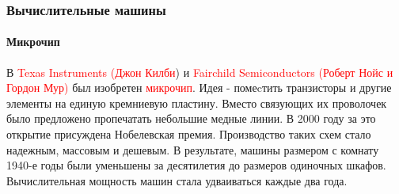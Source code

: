 \documentclass[aspectratio=169]{beamer}
\begin{document}
\begin{frame}
\frametitle{Вычислительные машины}
\framesubtitle{Микрочип}
\justifying
\small
В \textcolor{red}{Texas Instruments (Джон Килби}) и \textcolor{red}{Fairchild Semiconductors (Роберт Нойс и Гордон Мур)} был изобретен \textcolor{red}{микрочип}. Идея - помеcтить транзисторы и другие элементы на единую кремниевую пластину. Вместо связующих их проволочек было предложено пропечатать небольшие медные линии. В 2000 году за это открытие присуждена Нобелевская премия.\newline\newline 
Производство таких схем стало надежным, массовым и дешевым. В результате, машины размером с комнату 1940-е годы были уменьшены за десятилетия до размеров одиночных шкафов. Вычислительная мощность машин стала удваиваться каждые два года.

\begin{figure}
    \captionsetup[subfigure]{labelformat=empty}
    \centering
\end{figure}
\end{frame}
\end{document}
